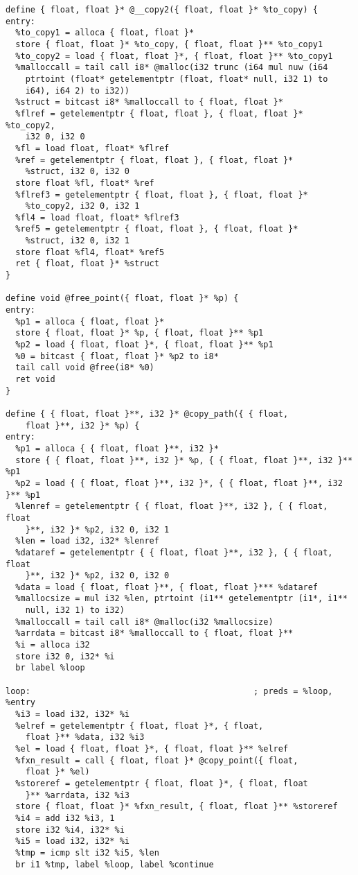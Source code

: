\documentclass[main.tex]{subfiles}
\begin{document}
{\begin{lstlisting}
define { float, float }* @__copy2({ float, float }* %to_copy) {
entry:
  %to_copy1 = alloca { float, float }*
  store { float, float }* %to_copy, { float, float }** %to_copy1
  %to_copy2 = load { float, float }*, { float, float }** %to_copy1
  %malloccall = tail call i8* @malloc(i32 trunc (i64 mul nuw (i64 
    ptrtoint (float* getelementptr (float, float* null, i32 1) to 
    i64), i64 2) to i32))
  %struct = bitcast i8* %malloccall to { float, float }*
  %flref = getelementptr { float, float }, { float, float }* %to_copy2,
    i32 0, i32 0
  %fl = load float, float* %flref
  %ref = getelementptr { float, float }, { float, float }*
    %struct, i32 0, i32 0
  store float %fl, float* %ref
  %flref3 = getelementptr { float, float }, { float, float }*
    %to_copy2, i32 0, i32 1
  %fl4 = load float, float* %flref3
  %ref5 = getelementptr { float, float }, { float, float }*
    %struct, i32 0, i32 1
  store float %fl4, float* %ref5
  ret { float, float }* %struct
}

define void @free_point({ float, float }* %p) {
entry:
  %p1 = alloca { float, float }*
  store { float, float }* %p, { float, float }** %p1
  %p2 = load { float, float }*, { float, float }** %p1
  %0 = bitcast { float, float }* %p2 to i8*
  tail call void @free(i8* %0)
  ret void
}

define { { float, float }**, i32 }* @copy_path({ { float, 
    float }**, i32 }* %p) {
entry:
  %p1 = alloca { { float, float }**, i32 }*
  store { { float, float }**, i32 }* %p, { { float, float }**, i32 }** %p1
  %p2 = load { { float, float }**, i32 }*, { { float, float }**, i32 }** %p1
  %lenref = getelementptr { { float, float }**, i32 }, { { float, float
    }**, i32 }* %p2, i32 0, i32 1
  %len = load i32, i32* %lenref
  %dataref = getelementptr { { float, float }**, i32 }, { { float, float 
    }**, i32 }* %p2, i32 0, i32 0
  %data = load { float, float }**, { float, float }*** %dataref
  %mallocsize = mul i32 %len, ptrtoint (i1** getelementptr (i1*, i1** 
    null, i32 1) to i32)
  %malloccall = tail call i8* @malloc(i32 %mallocsize)
  %arrdata = bitcast i8* %malloccall to { float, float }**
  %i = alloca i32
  store i32 0, i32* %i
  br label %loop

loop:                                             ; preds = %loop, %entry
  %i3 = load i32, i32* %i
  %elref = getelementptr { float, float }*, { float, 
    float }** %data, i32 %i3
  %el = load { float, float }*, { float, float }** %elref
  %fxn_result = call { float, float }* @copy_point({ float,
    float }* %el)
  %storeref = getelementptr { float, float }*, { float, float
    }** %arrdata, i32 %i3
  store { float, float }* %fxn_result, { float, float }** %storeref
  %i4 = add i32 %i3, 1
  store i32 %i4, i32* %i
  %i5 = load i32, i32* %i
  %tmp = icmp slt i32 %i5, %len
  br i1 %tmp, label %loop, label %continue


\end{lstlisting}}
\end{document}

